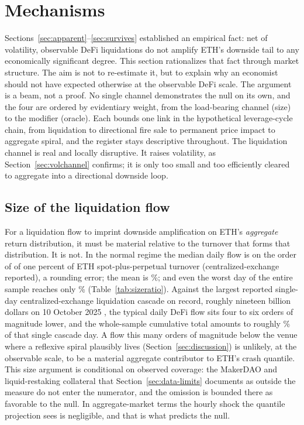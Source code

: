 \section{Mechanisms}
\label{sec:mechanisms}

Sections~\ref{sec:apparent}--\ref{sec:survives} established an empirical
fact: net of volatility, observable DeFi liquidations do not amplify ETH's
downside tail to any economically significant degree. This section
rationalizes that fact through market structure. The aim is not to
re-estimate it, but to explain why an economist should not have expected
otherwise at the observable DeFi scale. The argument is a beam, not a proof.
No single channel demonstrates the null on its own, and the four are ordered
by evidentiary weight, from the load-bearing channel (size) to the modifier
(oracle). Each bounds one link in the hypothetical leverage-cycle chain,
from liquidation to directional fire sale to permanent price impact to
aggregate spiral, and the register stays descriptive throughout. The
liquidation channel is real and locally disruptive. It raises volatility, as
Section~\ref{sec:volchannel} confirms; it is only too small and too
efficiently cleared to aggregate into a directional downside loop.

\subsection{Size of the liquidation flow}
\label{sec:size}

For a liquidation flow to imprint downside amplification on ETH's
\emph{aggregate} return distribution, it must be material relative to the
turnover that forms that distribution. It is not. In the normal regime the
median daily flow is on the order of \SizeMedianShare{} of one percent of
ETH spot-plus-perpetual turnover (centralized-exchange reported), a rounding error; the mean is
\SizeShareMean\%; and even the worst day of the entire sample reaches only
\SizeShareWorstDay\% (Table~\ref{tab:sizeratio}). Against the largest reported single-day
centralized-exchange liquidation cascade on record, roughly nineteen
billion dollars on 10 October 2025 \citep{coinglass2025}, the typical
daily DeFi flow sits four to six orders of magnitude lower, and the
whole-sample cumulative total amounts to roughly \SizeTotalVsCascade\% of
that single cascade day. A flow this
many orders of magnitude below the venue where a reflexive spiral
plausibly lives (Section~\ref{sec:discussion}) is unlikely, at the observable
scale, to be a material aggregate contributor to ETH's crash quantile. This
size argument is conditional on observed coverage: the MakerDAO and
liquid-restaking collateral that Section~\ref{sec:data-limits} documents as
outside the measure do not enter the numerator, and the omission is bounded
there as favorable to the null. In
aggregate-market terms the hourly shock the quantile projection sees is
negligible, and that is what predicts the null.

